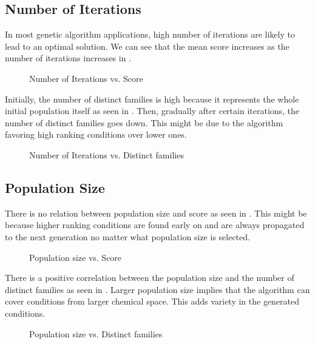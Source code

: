 \subsection{Number of Iterations} \label{sec:results-iterations}

In most genetic algorithm applications, high number of iterations are likely to lead to an optimal solution. We can see that the mean score increases as the number of iterations increases in . 

\begin{figure}[H]
	\caption{Number of Iterations vs. Score}
	\label{fig:ivs}
\end{figure}

Initially, the number of distinct families is high because it represents the whole initial population itself as seen in . Then, gradually after certain iterations, the number of distinct families goes down. This might be due to the algorithm favoring high ranking conditions over lower ones.

\begin{figure}[H]
	\caption{Number of Iterations vs. Distinct families}
	\label{fig:ivd}
\end{figure}

\subsection{Population Size} \label{sec:results-population}

There is no relation between population size and score as seen in . This might be because higher ranking conditions are found early on and are always propagated to the next generation no matter what population size is selected.

\begin{figure}[H]
	\caption{Population size vs. Score}
	\label{fig:pvs}
\end{figure}

There is a positive correlation between the population size and the number of distinct families as seen in . Larger population size implies that the algorithm can cover conditions from larger chemical space. This adds variety in the generated conditions.

\begin{figure}[H]
	\caption{Population size vs. Distinct families}
	\label{fig:pvd}
\end{figure}


